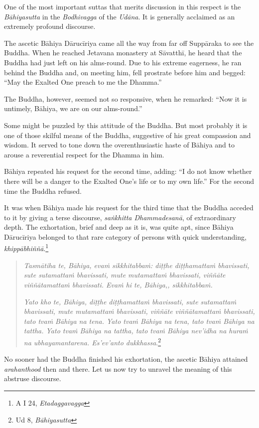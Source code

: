 One of the most important suttas that merits discussion in this respect is the \emph{Bāhiyasutta} in the \emph{Bodhivagga} of the \emph{Udāna}. It is generally acclaimed as an extremely profound discourse.

The ascetic Bāhiya Dārucīriya came all the way from far off Suppāraka to see the Buddha. When he reached Jetavana monastery at Sāvatthī, he heard that the Buddha had just left on his alms-round. Due to his extreme eagerness, he ran behind the Buddha and, on meeting him, fell prostrate before him and begged: ``May the Exalted One preach to me the Dhamma.''

The Buddha, however, seemed not so responsive, when he remarked: ``Now it is untimely, Bāhiya, we are on our alms-round.''

Some might be puzzled by this attitude of the Buddha. But most probably it is one of those skilful means of the Buddha, suggestive of his great compassion and wisdom. It served to tone down the overenthusiastic haste of Bāhiya and to arouse a reverential respect for the Dhamma in him.

Bāhiya repeated his request for the second time, adding: ``I do not know whether there will be a danger to the Exalted One's life or to my own life.'' For the second time the Buddha refused.

It was when Bāhiya made his request for the third time that the Buddha acceded to it by giving a terse discourse, \emph{saṅkhitta Dhammadesanā}, of extraordinary depth. The exhortation, brief and deep as it is, was quite apt, since Bāhiya Dārucīriya belonged to that rare category of persons with quick understanding, \emph{khippābhiññā}.\footnote{A I 24, \emph{Etadaggavagga}}

\begin{quote}
\emph{Tasmātiha te, Bāhiya, evaṁ sikkhitabbaṁ: diṭṭhe diṭṭhamattaṁ bhavissati, sute sutamattaṁ bhavissati, mute mutamattaṁ bhavissati, viññāte viññātamattaṁ bhavissati. Evaṁ hi te, Bāhiya,, sikkhitabbaṁ.}

\emph{Yato kho te, Bāhiya, diṭṭhe diṭṭhamattaṁ bhavissati, sute sutamattaṁ bhavissati, mute mutamattaṁ bhavissati, viññāte viññātamattaṁ bhavissati, tato tvaṁ Bāhiya na tena. Yato tvaṁ Bāhiya na tena, tato tvaṁ Bāhiya na tattha. Yato tvaṁ Bāhiya na tattha, tato tvaṁ Bāhiya nev'idha na huraṁ na ubhayamantarena. Es'ev'anto dukkhassa}.\footnote{Ud 8, \emph{Bāhiyasutta}}
\end{quote}

No sooner had the Buddha finished his exhortation, the ascetic Bāhiya attained \emph{arahanthood} then and there. Let us now try to unravel the meaning of this abstruse discourse.

